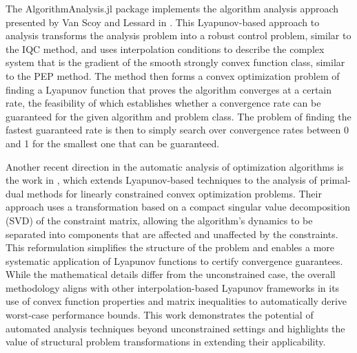The AlgorithmAnalysis.jl package implements the algorithm analysis approach presented by Van Scoy and Lessard in \cite{tutorial}. This Lyapunov-based approach to analysis transforms the analysis problem into a robust control problem, similar to the IQC method, and uses interpolation conditions to describe the complex system that is the gradient of the smooth strongly convex function class, similar to the PEP method. The method then forms a convex optimization problem of finding a Lyapunov function that proves the algorithm converges at a certain rate, the feasibility of which establishes whether a convergence rate can be guaranteed for the given algorithm and problem class. The problem of finding the fastest guaranteed rate is then to simply search over convergence rates between 0 and 1 for the smallest one that can be guaranteed.

Another recent direction in the automatic analysis of optimization algorithms is the work in \cite{primaldual}, which extends Lyapunov-based techniques to the analysis of primal-dual methods for linearly constrained convex optimization problems.  Their approach uses a transformation based on a compact singular value decomposition (SVD) of the constraint matrix, allowing the algorithm's dynamics to be separated into components that are affected and unaffected by the constraints. This reformulation simplifies the structure of the problem and enables a more systematic application of Lyapunov functions to certify convergence guarantees. While the mathematical details differ from the unconstrained case, the overall methodology aligns with other interpolation-based Lyapunov frameworks in its use of convex function properties and matrix inequalities to automatically derive worst-case performance bounds. This work demonstrates the potential of automated analysis techniques beyond unconstrained settings and highlights the value of structural problem transformations in extending their applicability.

